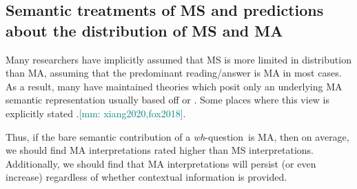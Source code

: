 \documentclass[12pt,letterpaper,table,svgnames,dvipsnames]{article}
\newcommand{\jd}[1]{\textcolor{Purple}{[jd: #1]}}
\newcommand{\mm}[1]{\textcolor{teal}{[mm: #1]}}
\newcommand{\whq}{\emph{wh}-question~}
\begin{document}



\subsection{Semantic treatments of MS and predictions about the distribution of MS and MA}


Many researchers have implicitly assumed that MS is more limited in distribution than MA, assuming that the predominant reading/answer is MA in most cases. As a result, many have maintained theories which posit only an underlying MA semantic representation usually based off  or . Some places where this view is explicitly stated \cite[Ch.6]{groenstok1982,groenstok1984,karttunen1977,vanrooij2003,nicolae2014,fox2014,xiang2016,dayal2016,george2011}.\mm{xiang2020,fox2018}. 




Thus, if the bare semantic contribution of a \whq is MA, then on average, we should find MA interpretations rated higher than MS interpretations. Additionally, we should find that MA interpretations will persist (or even increase) regardless of whether contextual information is provided.
\end{document}
